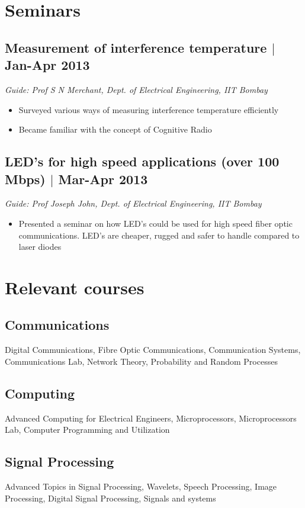 \documentclass[12pt]{article}
\begin{document}
\section*{Seminars}
\subsection*{Measurement of interference temperature $\vert$  Jan-Apr 2013} 
\emph{Guide: Prof S N Merchant, Dept. of Electrical Engineering, IIT Bombay}
\begin{itemize}  
\item Surveyed various ways of measuring interference temperature efficiently 
\item Became familiar with the concept of Cognitive Radio
\end{itemize}
  
\subsection*{LED's for high speed applications (over 100 Mbps) $\vert$  Mar-Apr 2013}
\emph{Guide: Prof Joseph John, Dept. of Electrical Engineering, IIT Bombay}  
\begin{itemize}  
\item Presented a seminar on how LED's could be used for high speed fiber optic communications. LED's are cheaper, rugged and safer to handle compared to laser diodes 
\end{itemize}

\section*{Relevant courses}

\subsection*{Communications}
Digital Communications, Fibre Optic Communications, Communication Systems, 
Communications Lab, Network Theory, Probability and Random Processes
\subsection*{Computing}
Advanced Computing for Electrical Engineers, Microprocessors, Microprocessors Lab, Computer Programming and Utilization
\subsection*{Signal Processing}
Advanced Topics in Signal Processing, Wavelets, Speech Processing, Image Processing,
Digital Signal Processing, Signals and systems
\end{document}
